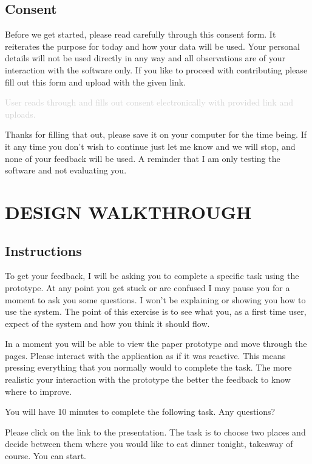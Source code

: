 \documentclass[a4 paper, 10pt]{article}
\begin{document}
    \subsection*{Consent}
        \begin{itshape}
            Before we get started, please read carefully through this consent form. It reiterates the purpose for today and how your data will be used. Your personal details will not be used directly in any way and all observations are of your interaction with the software only. If you like to proceed with contributing please fill out this form and upload with the given link.
        \end{itshape}
        
        \textcolor{lightgray}
            {User reads through and fills out consent electronically with provided link and uploads.}
        
        \begin{itshape}
            Thanks for filling that out, please save it on your computer for the time being. If it any time you don’t wish to continue just let me know and we will stop, and none of your feedback will be used. A reminder that I am only testing the software and not evaluating you.
        \end{itshape}

\section*{DESIGN WALKTHROUGH}
    \subsection*{Instructions}
        \begin{itshape}
            To get your feedback, I will be asking you to complete a specific task using the prototype. At any point you get stuck or are confused I may pause you for a moment to ask you some questions. I won’t be explaining or showing you how to use the system. The point of this exercise is to see what you, as a first time user, expect of the system and how you think it should flow.

            In a moment you will be able to view the paper prototype and move through the pages. Please interact with the application as if it was reactive. This means pressing everything that you normally would to complete the task. The more realistic your interaction with the prototype the better the feedback to know where to improve. 

            You will have 10 minutes to complete the following task. Any questions? 

            Please click on the link to the presentation. The task is to choose two places and decide between them where you would like to eat dinner tonight, takeaway of course. You can start.
        \end{itshape}
\end{document}
